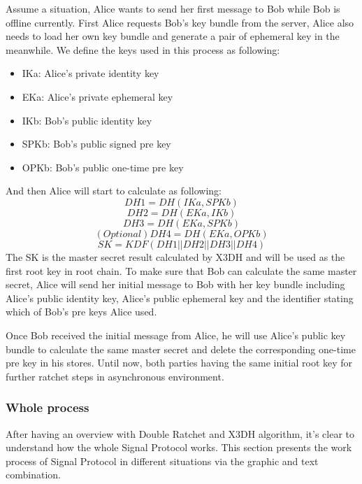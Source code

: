Assume a situation, Alice wants to send her first message to Bob while Bob is offline currently. First Alice requests Bob's key bundle from the server, Alice also needs to load her own key bundle and generate a pair of ephemeral key \citep{X3DH} in the meanwhile. We define the keys used in this process as following:
\begin{itemize}
\item IKa: Alice's private identity key
\item EKa: Alice's private ephemeral key
\item IKb: Bob's public identity key
\item SPKb: Bob's public signed pre key
\item OPKb: Bob's public one-time pre key
\end{itemize}
And then Alice will start to calculate as following:
\[ DH1=DH(IKa, SPKb) \]
\[ DH2=DH(EKa, IKb) \]
\[ DH3=DH(EKa, SPKb) \]
\[ (Optional) DH4=DH(EKa, OPKb) \]
\[ SK = KDF(DH1 || DH2 || DH3 || DH4) \]
The SK is the master secret result calculated by X3DH and will be used as the first root key in root chain. To make sure that Bob can calculate the same master secret, Alice will send her initial message to Bob with her key bundle including Alice's public identity key, Alice's public ephemeral key and the identifier stating which of Bob's pre keys Alice used.

Once Bob received the initial message from Alice, he will use Alice's public key bundle to calculate the same master secret and delete the corresponding one-time pre key in his stores. Until now, both parties having the same initial root key for further ratchet steps in asynchronous environment.

\subsubsection{Whole process}
After having an overview with Double Ratchet and X3DH algorithm, it's clear to understand how the whole Signal Protocol works. This section presents the work process of Signal Protocol in different situations via the graphic and text combination.

